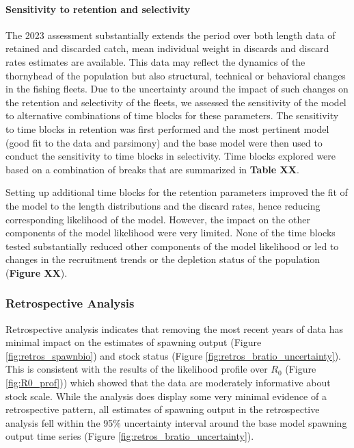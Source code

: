 \documentclass[11pt,
  english,
  letterpaper,
]{article}
\begin{document}
\hypertarget{sensitivity-to-retention-and-selectivity}{%
\paragraph{Sensitivity to retention and selectivity}\label{sensitivity-to-retention-and-selectivity}}

The 2023 assessment substantially extends the period over both length data of retained and discarded catch, mean individual weight in discards and discard rates estimates are available. This data may reflect the dynamics of the thornyhead of the population but also structural, technical or behavioral changes in the fishing fleets. Due to the uncertainty around the impact of such changes on the retention and selectivity of the fleets, we assessed the sensitivity of the model to alternative combinations of time blocks for these parameters. The sensitivity to time blocks in retention was first performed and the most pertinent model (good fit to the data and parsimony) and the base model were then used to conduct the sensitivity to time blocks in selectivity. Time blocks explored were based on a combination of breaks that are summarized in \textbf{Table XX}.

Setting up additional time blocks for the retention parameters improved the fit of the model to the length distributions and the discard rates, hence reducing corresponding likelihood of the model. However, the impact on the other components of the model likelihood were very limited. None of the time blocks tested substantially reduced other components of the model likelihood or led to changes in the recruitment trends or the depletion status of the population (\textbf{Figure XX}).

\hypertarget{retrospective-analysis}{%
\subsubsection{Retrospective Analysis}\label{retrospective-analysis}}

Retrospective analysis indicates that removing the most recent years of data has minimal impact on the estimates of spawning output (Figure \ref{fig:retros_spawnbio}) and stock status (Figure \ref{fig:retros_bratio_uncertainty}). This is consistent with the results of the likelihood profile over \(R_0\) (Figure \ref{fig:R0_prof})) which showed that the data are moderately informative about stock scale. While the analysis does display some very minimal evidence of a retrospective pattern, all estimates of spawning output in the retrospective analysis fell within the 95\% uncertainty interval around the base model spawning output time series (Figure \ref{fig:retros_bratio_uncertainty}).
\end{document}
